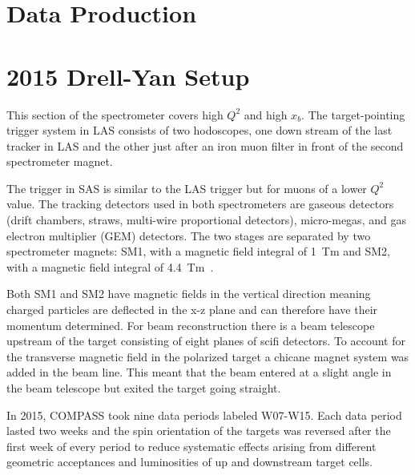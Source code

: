 \section{Data Production}

\section{2015 Drell-Yan Setup}


This section of the spectrometer covers high
$Q^2$ and high $x_b$.  The target-pointing trigger system in LAS consists of two
hodoscopes, one down stream of the last tracker in LAS and the other just after
an iron muon filter in front of the second spectrometer magnet.

The trigger in SAS is
similar to the LAS trigger but for muons of a lower $Q^2$ value.  The tracking
detectors used in both spectrometers are gaseous detectors (drift chambers,
straws, multi-wire proportional detectors), micro-megas, and gas electron
multiplier (GEM) detectors.  The two stages are separated by two spectrometer
magnets: SM1, with a magnetic field integral of 1~Tm and SM2, with a magnetic
field integral of 4.4~Tm~\cite{compassSpec}.

Both SM1 and SM2 have magnetic
fields in the vertical direction meaning charged particles are deflected in the
x-z plane and can therefore have their momentum determined.  For beam
reconstruction there is a beam telescope upstream of the target consisting of
eight planes of scifi detectors.  To account for the transverse magnetic field
in the polarized target a chicane magnet system was added in the beam line.
This meant that the beam entered at a slight angle in the beam telescope but
exited the target going straight. \par

In 2015, COMPASS took nine data periods labeled W07-W15.  Each data period
lasted two weeks and the spin orientation of the targets was reversed after the
first week of every period to reduce systematic effects arising from different
geometric acceptances and luminosities of up and downstream target cells.


